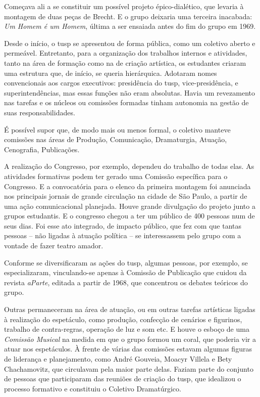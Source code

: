 Começava ali a se constituir um possível projeto épico-dialético, que
levaria à montagem de duas peças de Brecht. E o grupo deixaria uma
terceira inacabada: {\it Um Homem é um Homem}, última a ser ensaiada
antes do fim do grupo em 1969.

\subject{Organização do trabalho: comissões internas}

Desde o início, o {\sc tusp} se apresentou de forma pública, como um coletivo
aberto e permeável. Entretanto, para a organização dos trabalhos
internos e atividades, tanto na área de formação como na de criação
artística, os estudantes criaram uma estrutura que, de início, se queria
hierárquica. Adotaram nomes convencionais aos cargos executivos:
presidência do {\sc tusp}, vice-presidência, e superintendências, mas essas
funções não eram absolutas. Havia um revezamento nas tarefas e os
núcleos ou comissões formadas tinham autonomia na gestão de suas
responsabilidades.

É possível supor que, de modo mais ou menos formal, o coletivo manteve
comissões nas áreas de Produção, Comunicação, Dramaturgia, Atuação,
Cenografia, Publicações.

A realização do Congresso, por exemplo, dependeu do trabalho de todas
elas. As atividades formativas podem ter gerado uma Comissão específica
para o Congresso. E a convocatória para o elenco da primeira montagem
foi anunciada nos principais jornais de grande circulação na cidade de
São Paulo, a partir de uma ação comunicacional planejada. Houve grande
divulgação do projeto junto a grupos estudantis. E o congresso chegou a
ter um público de 400 pessoas num de seus dias. Foi esse ato integrado,
de impacto público, que fez com que tantas pessoas -- não ligadas à
atuação política -- se interessassem pelo grupo com a vontade de fazer
teatro amador.

Conforme se diversificaram as ações do {\sc tusp}, algumas pessoas, por
exemplo, se especializaram, vinculando-se apenas à Comissão de
Publicação que cuidou da revista {\it aParte}, editada a partir de 1968,
que concentrou os debates teóricos do grupo.

Outras permaneceram na área de atuação, ou em outras tarefas artísticas
ligadas à realização do espetáculo, como produção, confecção de cenários
e figurinos, trabalho de contra-regras, operação de luz e som etc. E
houve o esboço de uma {\it Comissão Musical} na medida em que o grupo
formou um coral, que poderia vir a atuar nos espetáculos. À frente de
várias das comissões estavam algumas figuras de liderança e
planejamento, como André Gouveia, Moacyr Villela e Bety Chachamovitz,
que circulavam pela maior parte delas. Faziam parte do conjunto de
pessoas que participaram das reuniões de criação do {\sc tusp}, que idealizou
o processo formativo e constituiu o Coletivo Dramatúrgico.


